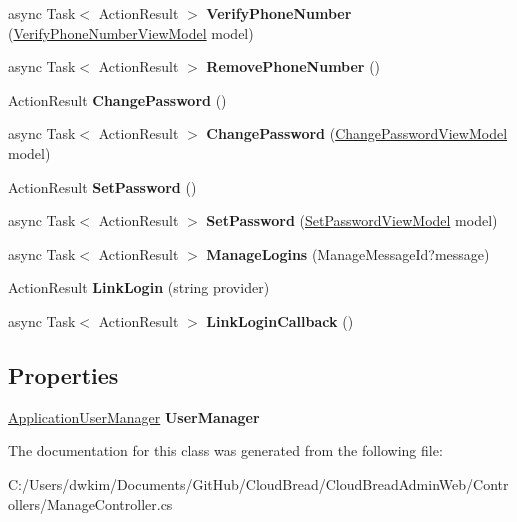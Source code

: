 \begin{DoxyCompactItemize}
\item 
async Task$<$ Action\+Result $>$ {\bfseries Verify\+Phone\+Number} (\hyperlink{a00193}{Verify\+Phone\+Number\+View\+Model} model)\hypertarget{a00133_aeb749a4cccce0da0fa207a62357a5e55}{}\label{a00133_aeb749a4cccce0da0fa207a62357a5e55}

\item 
async Task$<$ Action\+Result $>$ {\bfseries Remove\+Phone\+Number} ()\hypertarget{a00133_ad7f9a4017abac903dcf9560ce78e19cc}{}\label{a00133_ad7f9a4017abac903dcf9560ce78e19cc}

\item 
Action\+Result {\bfseries Change\+Password} ()\hypertarget{a00133_ade56c10015083413bdef6ffd2ad81338}{}\label{a00133_ade56c10015083413bdef6ffd2ad81338}

\item 
async Task$<$ Action\+Result $>$ {\bfseries Change\+Password} (\hyperlink{a00064}{Change\+Password\+View\+Model} model)\hypertarget{a00133_ab58811021906eb6c625076add84df445}{}\label{a00133_ab58811021906eb6c625076add84df445}

\item 
Action\+Result {\bfseries Set\+Password} ()\hypertarget{a00133_a90fad78b6c0ffb66f1e00accb28825fe}{}\label{a00133_a90fad78b6c0ffb66f1e00accb28825fe}

\item 
async Task$<$ Action\+Result $>$ {\bfseries Set\+Password} (\hyperlink{a00180}{Set\+Password\+View\+Model} model)\hypertarget{a00133_adb6c5449627ef88d6b3ec43840ebe4df}{}\label{a00133_adb6c5449627ef88d6b3ec43840ebe4df}

\item 
async Task$<$ Action\+Result $>$ {\bfseries Manage\+Logins} (Manage\+Message\+Id?message)\hypertarget{a00133_a25bed768c69c7fb329d8a7b3e58a1f08}{}\label{a00133_a25bed768c69c7fb329d8a7b3e58a1f08}

\item 
Action\+Result {\bfseries Link\+Login} (string provider)\hypertarget{a00133_a6d6242b23d9aeaa50288d389d31e8493}{}\label{a00133_a6d6242b23d9aeaa50288d389d31e8493}

\item 
async Task$<$ Action\+Result $>$ {\bfseries Link\+Login\+Callback} ()\hypertarget{a00133_a99fceb22c48a89bd03e86afa42189b25}{}\label{a00133_a99fceb22c48a89bd03e86afa42189b25}

\end{DoxyCompactItemize}
\subsection*{Properties}
\begin{DoxyCompactItemize}
\item 
\hyperlink{a00019}{Application\+User\+Manager} {\bfseries User\+Manager}\hypertarget{a00133_a5cdb4aff4fe4c96ee42a67ae0695dc16}{}\label{a00133_a5cdb4aff4fe4c96ee42a67ae0695dc16}

\end{DoxyCompactItemize}


The documentation for this class was generated from the following file\+:\begin{DoxyCompactItemize}
\item 
C\+:/\+Users/dwkim/\+Documents/\+Git\+Hub/\+Cloud\+Bread/\+Cloud\+Bread\+Admin\+Web/\+Controllers/Manage\+Controller.\+cs\end{DoxyCompactItemize}
